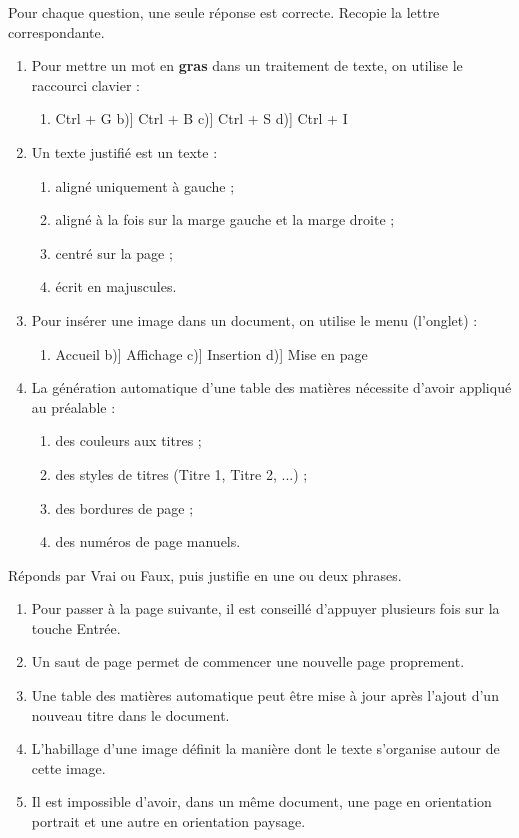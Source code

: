 \documentclass[11pt]{article}
\newcommand{\cle}[1]{{\popxbold\color{popdark}#1}}
\begin{document}
\begin{exercice}
Pour chaque question, une seule réponse est correcte. Recopie la lettre correspondante.
\begin{enumerate}
\item Pour mettre un mot en \textbf{gras} dans un traitement de texte, on utilise le raccourci clavier :
\begin{enumerate}
\item[a)] Ctrl + G \quad b)] Ctrl + B \quad c)] Ctrl + S \quad d)] Ctrl + I
\end{enumerate}
\item Un texte \cle{justifié} est un texte :
\begin{enumerate}
\item[a)] aligné uniquement à gauche ;
\item[b)] aligné à la fois sur la marge gauche et la marge droite ;
\item[c)] centré sur la page ;
\item[d)] écrit en majuscules.
\end{enumerate}
\item Pour insérer une image dans un document, on utilise le menu (l'onglet) :
\begin{enumerate}
\item[a)] Accueil \quad b)] Affichage \quad c)] Insertion \quad d)] Mise en page
\end{enumerate}
\item La génération automatique d'une table des matières nécessite d'avoir appliqué au préalable :
\begin{enumerate}
\item[a)] des couleurs aux titres ;
\item[b)] des styles de titres (Titre 1, Titre 2, ...) ;
\item[c)] des bordures de page ;
\item[d)] des numéros de page manuels.
\end{enumerate}
\end{enumerate}
\end{exercice}

\begin{exercice}
Réponds par Vrai ou Faux, puis justifie en une ou deux phrases.
\begin{enumerate}
\item Pour passer à la page suivante, il est conseillé d'appuyer plusieurs fois sur la touche Entrée.
\item Un \cle{saut de page} permet de commencer une nouvelle page proprement.
\item Une table des matières automatique peut être mise à jour après l'ajout d'un nouveau titre dans le document.
\item L'\cle{habillage} d'une image définit la manière dont le texte s'organise autour de cette image.
\item Il est impossible d'avoir, dans un même document, une page en orientation portrait et une autre en orientation paysage.
\end{enumerate}
\end{exercice}
\end{document}

